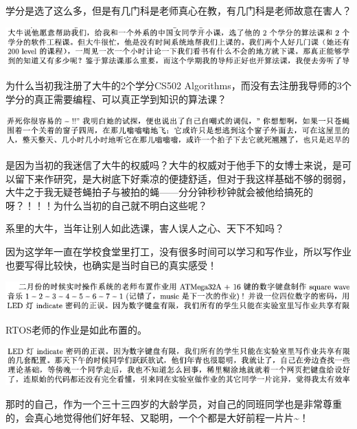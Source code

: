 \documentclass[9pt, b5paper]{article}
\begin{document}
学分是选了这么多，但是有几门科是老师真心在教，有几门科是老师故意在害人？

\begin{center}
\includegraphics[width=.9\linewidth]{./pic/backups_plans_20210504_112212.png}
\end{center}

为什么当初我注册了大牛的2个学分CS502 Algorithms，而没有去注册我导师的3个学分的真正需要编程、可以真正学到知识的算法课？

\begin{center}
\includegraphics[width=.9\linewidth]{./pic/backups_plans_20210504_113006.png}
\end{center}

是因为当初的我迷信了大牛的权威吗？大牛的权威对于他手下的女博士来说，是可以留下来作研究，是大树底下好乘凉的便捷舒适，但对于我这样基础不够的弱弱，大牛之于我无疑苍蝇拍子与被拍的蝇——分分钟秒秒钟就会被他给搞死的呀？！！！为什么当初的自己就不明白这些呢？

系里的大牛，当年让别人如此选课，害人误人之心、天下不知吗？

因为这学年一直在学校食堂里打工，没有很多时间可以学习和写作业，所以写作业也要写得比较快，也确实是当时自已的真实感受！

\begin{center}
\includegraphics[width=.9\linewidth]{./pic/backups_plans_20210502_115842.png}
\end{center}

RTOS老师的作业是如此布置的。

\begin{center}
\includegraphics[width=.9\linewidth]{./pic/backups_plans_20210502_115915.png}
\end{center}

那时的自己，作为一个三十三四岁的大龄学员，对自己的同班同学也是非常尊重的，会真心地觉得他们好年轻、又聪明，一个个都是大好前程一片片\textasciitilde{}！
\end{document}
